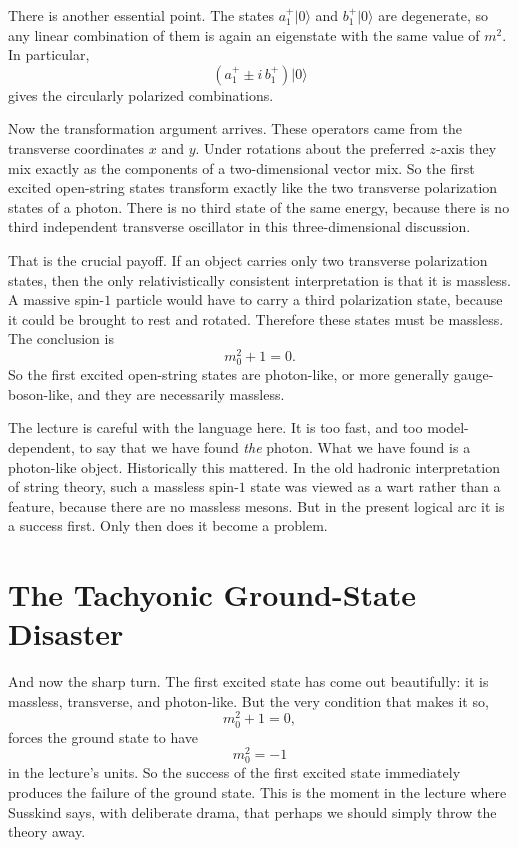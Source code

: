 There is another essential point. The states \(a_1^+|0\rangle\) and \(b_1^+|0\rangle\) are degenerate, so any linear combination of them is again an eigenstate with the same value of \(m^2\). In particular,
\begin{equation}
\left(a_1^+\pm i\,b_1^+\right)|0\rangle
\end{equation}
gives the circularly polarized combinations.

Now the transformation argument arrives. These operators came from the transverse coordinates \(x\) and \(y\). Under rotations about the preferred \(z\)-axis they mix exactly as the components of a two-dimensional vector mix. So the first excited open-string states transform exactly like the two transverse polarization states of a photon. There is no third state of the same energy, because there is no third independent transverse oscillator in this three-dimensional discussion.

That is the crucial payoff. If an object carries only two transverse polarization states, then the only relativistically consistent interpretation is that it is massless. A massive spin-\(1\) particle would have to carry a third polarization state, because it could be brought to rest and rotated. Therefore these states must be massless. The conclusion is
\begin{equation}
m_0^2+1=0.
\end{equation}
So the first excited open-string states are photon-like, or more generally gauge-boson-like, and they are necessarily massless.

The lecture is careful with the language here. It is too fast, and too model-dependent, to say that we have found \emph{the} photon. What we have found is a photon-like object. Historically this mattered. In the old hadronic interpretation of string theory, such a massless spin-\(1\) state was viewed as a wart rather than a feature, because there are no massless mesons. But in the present logical arc it is a success first. Only then does it become a problem.

\section{The Tachyonic Ground-State Disaster}

And now the sharp turn. The first excited state has come out beautifully: it is massless, transverse, and photon-like. But the very condition that makes it so,
\begin{equation}
m_0^2+1=0,
\end{equation}
forces the ground state to have
\begin{equation}
m_0^2=-1
\end{equation}
in the lecture's units. So the success of the first excited state immediately produces the failure of the ground state. This is the moment in the lecture where Susskind says, with deliberate drama, that perhaps we should simply throw the theory away.

